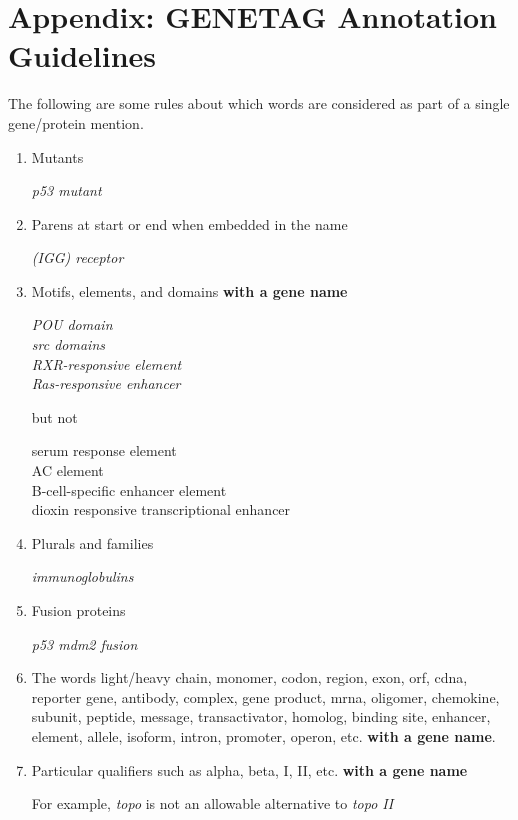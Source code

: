 
\newpage

\section*{Appendix: GENETAG Annotation Guidelines}

The following are some rules about which words are considered as part of a single gene/protein mention.

\begin{enumerate}

\item Mutants

\emph{p53 mutant}

\item Parens at start or end when embedded in the name

\emph{(IGG) receptor}

\item Motifs, elements, and domains \textbf{with a gene name}

\emph{POU domain\\
src domains\\
RXR-responsive element\\
Ras-responsive enhancer}

but not

serum response element\\
AC element\\
B-cell-specific enhancer element\\
dioxin responsive transcriptional enhancer

\item Plurals and families

\emph{immunoglobulins}

\item Fusion proteins

\emph{p53 mdm2 fusion}

\item The words light/heavy chain, monomer, codon, region, exon, orf, cdna, reporter gene,
antibody, complex, gene product, mrna, oligomer, chemokine, subunit, peptide, message,
transactivator, homolog, binding site, enhancer, element, allele, isoform, intron,
promoter, operon, etc. \textbf{with a gene name}.

\item Particular qualifiers such as alpha, beta, I, II, etc. \textbf{with a gene name}

For example, \emph{topo} is not an allowable alternative to \emph{topo II}


\end{enumerate}
